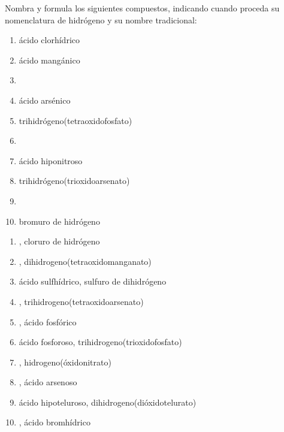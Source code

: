 \begin{exercise}[
  tags    = {inorgánica,ácidos,ácidos binarios,ácidos ternarios,oxoácidos},
  topics  = {química inorgánica,formulación,nomenclatura},
  source  = {SAN Formulación, p28, e35},
  ]
  Nombra y formula los siguientes compuestos, indicando cuando proceda su nomenclatura de hidrógeno y su nombre tradicional:

  \begin{enumerate}
    \item ácido clorhídrico
    \item ácido mangánico
    \item {}
    \item ácido arsénico
    \item trihidrógeno(tetraoxidofosfato)
    \item {}
    \item ácido hiponitroso
    \item trihidrógeno(trioxidoarsenato)
    \item {}
    \item bromuro de hidrógeno
  \end{enumerate}
\end{exercise}

\begin{solution}
  \begin{enumerate}
    \item {}, cloruro de hidrógeno
    \item {}, dihidrogeno(tetraoxidomanganato)
    \item ácido sulfhídrico, sulfuro de dihidrógeno
    \item {}, trihidrogeno(tetraoxidoarsenato)
    \item {}, ácido fosfórico
    \item ácido fosforoso, trihidrogeno(trioxidofosfato)
    \item {}, hidrogeno(óxidonitrato)
    \item {}, ácido arsenoso
    \item ácido hipoteluroso, dihidrogeno(dióxidotelurato)
    \item {}, ácido bromhídrico
  \end{enumerate}
\end{solution}




